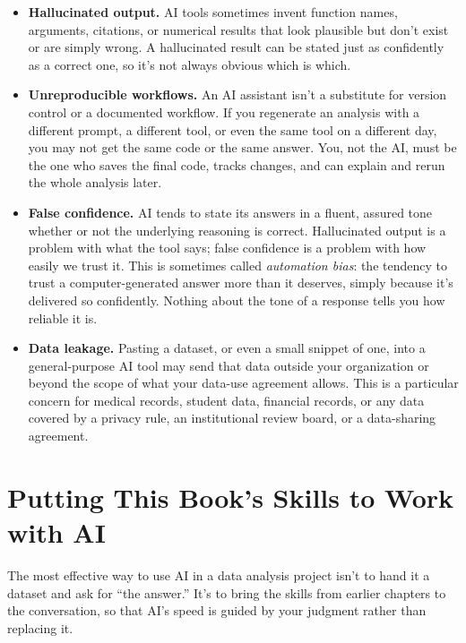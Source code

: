 \begin{itemize}
\item \textbf{Hallucinated output.} AI tools sometimes
  invent function names, arguments, citations, or numerical results
  that look plausible but don't exist or are simply wrong. A
  hallucinated result can be stated just as confidently as a correct
  one, so it's not always obvious which is which.
\item \textbf{Unreproducible workflows.} An AI
  assistant isn't a substitute for version control or a documented
  workflow. If you regenerate an analysis with a different prompt, a
  different tool, or even the same tool on a different day, you may
  not get the same code or the same answer. You, not the AI, must be
  the one who saves the final code, tracks changes, and can explain
  and rerun the whole analysis later.
\item \textbf{False confidence.} AI tends to state its answers in a
  fluent, assured tone whether or not the underlying reasoning is
  correct. Hallucinated output is a problem with what the tool says;
  false confidence is a problem with how easily we trust it. This is
  sometimes called \emph{automation
  bias}: the tendency to trust a
  computer-generated answer more than it deserves, simply because it's
  delivered so confidently. Nothing about the tone of a response
  tells you how reliable it is.
\item \textbf{Data leakage.} Pasting a
  dataset, or even a small snippet of one, into a general-purpose AI
  tool may send that data outside your organization or beyond the
  scope of what your data-use agreement allows. This is a particular
  concern for medical records, student data, financial records, or any
  data covered by a privacy rule, an institutional review board, or a
  data-sharing agreement.
\end{itemize}

\section{Putting This Book's Skills to Work with AI}

The most effective way to use AI in a data analysis project isn't to
hand it a dataset and ask for ``the answer.'' It's to bring the
skills from earlier chapters to the conversation, so that AI's speed
is guided by your judgment rather than replacing it.

